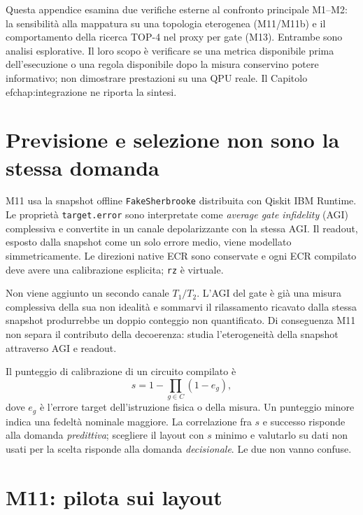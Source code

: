 \begin{onehalfspace}

Questa appendice esamina due verifiche esterne al confronto principale M1--M2: la sensibilit\`a alla mappatura su una topologia eterogenea (M11/M11b) e il comportamento della ricerca TOP-4 nel proxy per gate (M13). Entrambe sono analisi esplorative. Il loro scopo \`e verificare se una metrica disponibile prima dell'esecuzione o una regola disponibile dopo la misura conservino potere informativo; non dimostrare prestazioni su una QPU reale. Il Capitolo~
ef{chap:integrazione} ne riporta la sintesi.

\section{Previsione e selezione non sono la stessa domanda}
\label{sec:app_comp_previsione}

M11 usa la snapshot offline \texttt{FakeSherbrooke} distribuita con Qiskit IBM Runtime. Le propriet\`a \texttt{target.error} sono interpretate come \emph{average gate infidelity} (AGI) complessiva e convertite in un canale depolarizzante con la stessa AGI. Il readout, esposto dalla snapshot come un solo errore medio, viene modellato simmetricamente. Le direzioni native ECR sono conservate e ogni ECR compilato deve avere una calibrazione esplicita; \texttt{rz} \`e virtuale.

Non viene aggiunto un secondo canale $T_1/T_2$. L'AGI del gate \`e gi\`a una misura complessiva della sua non idealit\`a e sommarvi il rilassamento ricavato dalla stessa snapshot produrrebbe un doppio conteggio non quantificato. Di conseguenza M11 non separa il contributo della decoerenza: studia l'eterogeneit\`a della snapshot attraverso AGI e readout.

Il punteggio di calibrazione di un circuito compilato \`e
\begin{equation}
    s = 1-\prod_{g\in C}(1-e_g),
\end{equation}
dove $e_g$ \`e l'errore target dell'istruzione fisica o della misura. Un punteggio minore indica una fedelt\`a nominale maggiore. La correlazione fra $s$ e successo risponde alla domanda \emph{predittiva}; scegliere il layout con $s$ minimo e valutarlo su dati non usati per la scelta risponde alla domanda \emph{decisionale}. Le due non vanno confuse.

\section{M11: pilota sui layout}
\label{sec:app_comp_pilota}


\end{onehalfspace}
